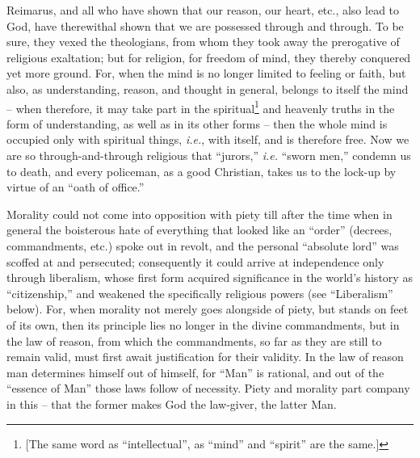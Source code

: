 Reimarus, and all who have shown that our reason, our heart, etc., also lead 
to God, have therewithal shown that we are possessed through and through. To 
be sure, they vexed the theologians, from whom they took away the prerogative 
of religious exaltation; but for religion, for freedom of mind, they thereby 
conquered yet more ground. For, when the mind is no longer limited to feeling 
or faith, but also, as understanding, reason, and thought in general, belongs 
to itself the mind -- when therefore, it may take part in the 
spiritual\footnote{[The same word as ``intellectual'', as ``mind'' and 
``spirit'' are the same.]} and heavenly truths in the form of understanding, 
as well as in its other forms -- then the whole mind is occupied only with 
spiritual things, \textit{i.e.}, with itself, and is therefore free. Now we 
are so through-and-through religious that ``jurors,'' \textit{i.e.} ``sworn 
men,'' condemn us to death, and every policeman, as a good Christian, takes 
us to the lock-up by virtue of an ``oath of office.''

Morality could not come into opposition with piety till after the time when in 
general the boisterous hate of everything that looked like an ``order'' 
(decrees, commandments, etc.) spoke out in revolt, and the personal 
``absolute lord'' was scoffed at and persecuted; consequently it could 
arrive at independence only through liberalism, whose first form acquired 
significance in the world's history as ``citizenship,'' and weakened the 
specifically religious powers (see ``Liberalism'' below). For, when morality 
not merely goes alongside of piety, but stands on feet of its own, then its 
principle lies no longer in the divine commandments, but in the law of reason, 
from which the commandments, so far as they are still to remain valid, must 
first await justification for their validity. In the law of reason man 
determines himself out of himself, for ``Man'' is rational, and out of the 
``essence of Man'' those laws follow of necessity. Piety and morality part 
company in this -- that the former makes God the law-giver, the latter Man.

